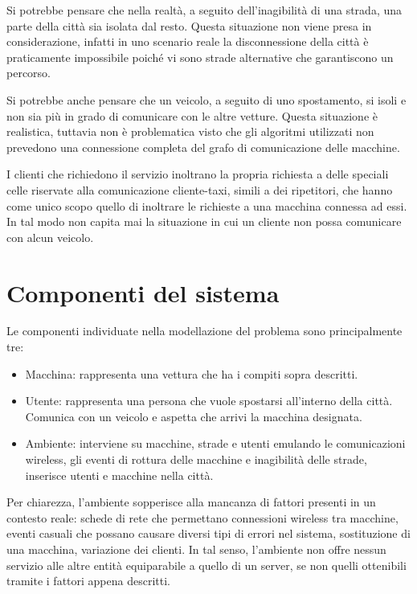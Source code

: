 Si potrebbe pensare che nella realtà, a seguito dell'inagibilità di una strada, una parte della città sia isolata dal resto. Questa situazione non viene presa in considerazione, infatti in uno scenario reale la disconnessione della città è praticamente impossibile poiché vi sono strade alternative che garantiscono un percorso.

Si potrebbe anche pensare che un veicolo, a seguito di uno spostamento, si isoli e non sia più in grado di comunicare con le altre vetture. Questa situazione è realistica, tuttavia non è problematica visto che gli algoritmi utilizzati non prevedono una connessione completa del grafo di comunicazione delle macchine.

I clienti che richiedono il servizio inoltrano la propria richiesta a delle speciali celle riservate alla comunicazione cliente-taxi, simili a dei ripetitori, che hanno come unico scopo quello di inoltrare le richieste a una macchina connessa ad essi. In tal modo non capita mai la situazione in cui un cliente non possa comunicare con alcun veicolo. 

\section{Componenti del sistema}

Le componenti individuate nella modellazione del problema sono principalmente tre:

\begin{itemize}
	\item Macchina: rappresenta una vettura che ha i compiti sopra descritti.
	\item Utente: rappresenta una persona che vuole spostarsi all'interno della città. Comunica con un veicolo e aspetta che arrivi la macchina designata.
	\item Ambiente: interviene su macchine, strade e utenti emulando le comunicazioni wireless, gli eventi di rottura delle macchine e inagibilità delle strade, inserisce utenti e macchine nella città.
\end{itemize}

Per chiarezza, l'ambiente sopperisce alla mancanza di fattori presenti in un contesto reale: schede di rete che permettano connessioni wireless tra macchine, eventi casuali che possano causare diversi tipi di errori nel sistema, sostituzione di una macchina, variazione dei clienti. In tal senso, l'ambiente non offre nessun servizio alle altre entità equiparabile a quello di un server, se non quelli ottenibili tramite i fattori appena descritti.

